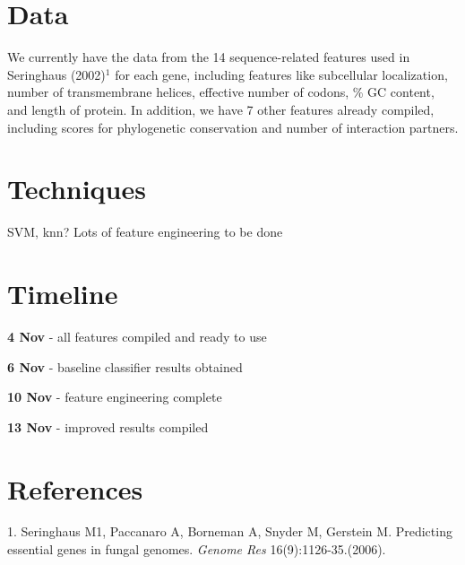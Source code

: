 \documentclass{article}
\begin{document}
\section{Data} \label{Data}

We currently have the data from the 14 sequence-related features used in Seringhaus (2002)$^1$ for each gene, including features like subcellular localization, number of transmembrane helices, effective number of codons, \% GC content, and length of protein. In addition, we have 7 other features already compiled, including scores for phylogenetic conservation and number of interaction partners. 


\section{Techniques}
SVM, knn?
Lots of feature engineering to be done


\section{Timeline}
\begin{multicols}{2}

\noindent
\textbf{4 Nov} - all features compiled and ready to use

\noindent
\textbf{6 Nov} - baseline classifier results obtained

\noindent
\textbf{10 Nov} - feature engineering complete

\noindent
\textbf{13 Nov} - improved results compiled
\end{multicols}

\section{References}
1. Seringhaus M1, Paccanaro A, Borneman A, Snyder M, Gerstein M. Predicting essential genes in fungal genomes. \textit{Genome Res} 16(9):1126-35.(2006).
\end{document}
